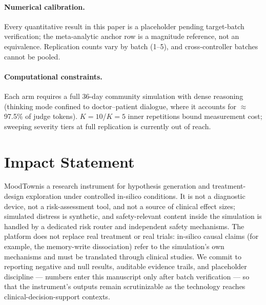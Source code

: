 \documentclass[10pt]{article}
\newcommand{\sys}{MoodTown}
\begin{document}
\paragraph{Numerical calibration.}
Every quantitative result in this paper is a placeholder pending target-batch verification; the meta-analytic anchor row is a magnitude reference, not an equivalence.
Replication counts vary by batch (1--5), and cross-controller batches cannot be pooled.

\paragraph{Computational constraints.}
Each arm requires a full 36-day community simulation with dense reasoning (thinking mode confined to doctor--patient dialogue, where it accounts for $\approx$97.5\% of judge tokens).
$K=10$/$K=5$ inner repetitions bound measurement cost; sweeping severity tiers at full replication is currently out of reach.

\section*{Impact Statement}

\sys is a research instrument for hypothesis generation and treatment-design exploration under controlled in-silico conditions.
It is not a diagnostic device, not a risk-assessment tool, and not a source of clinical effect sizes; simulated distress is synthetic, and safety-relevant content inside the simulation is handled by a dedicated risk router and independent safety mechanisms.
The platform does not replace real treatment or real trials: in-silico causal claims (for example, the memory-write dissociation) refer to the simulation's own mechanisms and must be translated through clinical studies.
We commit to reporting negative and null results, auditable evidence trails, and placeholder discipline --- numbers enter this manuscript only after batch verification --- so that the instrument's outputs remain scrutinizable as the technology reaches clinical-decision-support contexts.



\end{document}
